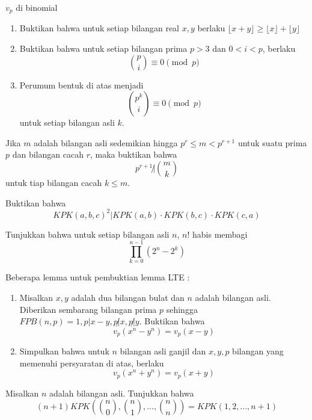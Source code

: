 \documentclass[11pt]{scrartcl}
\begin{document}
\begin{problem}
    $v_p$ di binomial
    \begin{enumerate}
        \item Buktikan bahwa untuk setiap bilangan real $x, y$ berlaku $\lfloor x+y \rfloor \geq \lfloor x \rfloor + \lfloor y \rfloor$
        \item Buktikan bahwa untuk setiap bilangan prima $p > 3$ dan $0 < i < p$, berlaku $$\binom{p}{i} \equiv 0 \pmod{p}$$
        \item Perumum bentuk di atas menjadi $$\binom{p^k}{i} \equiv 0 \pmod{p}$$ untuk setiap bilangan asli $k$.
    \end{enumerate}
\end{problem}

\begin{problem}
    Jika $m$ adalah bilangan asli sedemikian hingga $p^r \leq m < p^{r+1}$ untuk suatu prima $p$ dan bilangan cacah $r$, maka buktikan bahwa $$p^{r+1} \not | \binom{m}{k}$$ untuk tiap bilangan cacah $k \leq m$.    
\end{problem}

\begin{problem}
    Buktikan bahwa \[KPK(a, b, c)^2 | KPK(a, b)\cdot KPK(b, c) \cdot KPK(c, a)\]
\end{problem}

\begin{problem}
    Tunjukkan bahwa untuk setiap bilangan asli $n$, $n!$ habis membagi $$\prod_{k = 0}^{n - 1} (2^n - 2^k)$$    
\end{problem}

\begin{problem}
    Beberapa lemma untuk pembuktian lemma LTE :
    \begin{enumerate}
        \item Misalkan $x,y$ adalah dua bilangan bulat dan $n$ adalah bilangan asli. Diberikan sembarang bilangan prima $p$ sehingga $FPB(n,p) = 1, p| x - y, p \not| x, p\not| y$. Buktikan bahwa $$v_p(x^n - y^n) = v_p(x - y)$$
        \item Simpulkan bahwa untuk $n$ bilangan asli ganjil dan $x,y,p$ bilangan yang memenuhi persyaratan di atas, berlaku $$v_p(x^n + y^n) = v_p(x + y)$$
    \end{enumerate}
\end{problem}

\begin{problem}
    Misalkan $n$ adalah bilangan asli. Tunjukkan bahwa $$(n+1) KPK\left(\binom{n}{0}, \binom{n}{1},..., \binom{n}{n}\right) = KPK(1, 2,..., n+1)$$
\end{problem}
\end{document}
